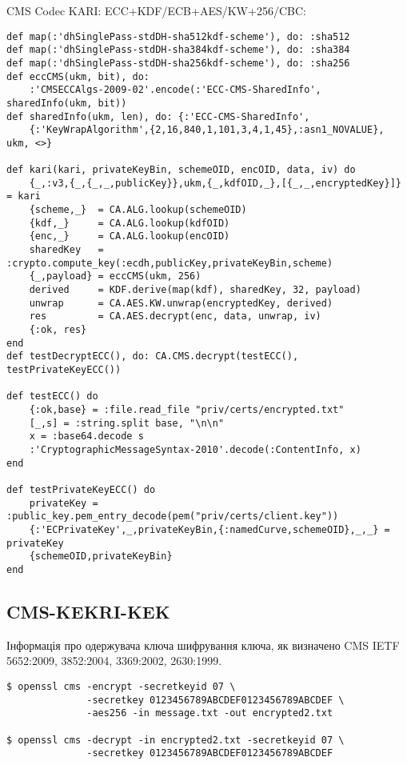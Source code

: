 CMS Codec KARI: ECC+KDF/ECB+AES/KW+256/CBC:

\begin{lstlisting}
def map(:'dhSinglePass-stdDH-sha512kdf-scheme'), do: :sha512
def map(:'dhSinglePass-stdDH-sha384kdf-scheme'), do: :sha384
def map(:'dhSinglePass-stdDH-sha256kdf-scheme'), do: :sha256
def eccCMS(ukm, bit), do:
    :'CMSECCAlgs-2009-02'.encode(:'ECC-CMS-SharedInfo', sharedInfo(ukm, bit))
def sharedInfo(ukm, len), do: {:'ECC-CMS-SharedInfo',
    {:'KeyWrapAlgorithm',{2,16,840,1,101,3,4,1,45},:asn1_NOVALUE}, ukm, <>}

def kari(kari, privateKeyBin, schemeOID, encOID, data, iv) do
    {_,:v3,{_,{_,_,publicKey}},ukm,{_,kdfOID,_},[{_,_,encryptedKey}]} = kari
    {scheme,_}  = CA.ALG.lookup(schemeOID)
    {kdf,_}     = CA.ALG.lookup(kdfOID)
    {enc,_}     = CA.ALG.lookup(encOID)
    sharedKey   = :crypto.compute_key(:ecdh,publicKey,privateKeyBin,scheme)
    {_,payload} = eccCMS(ukm, 256)
    derived     = KDF.derive(map(kdf), sharedKey, 32, payload)
    unwrap      = CA.AES.KW.unwrap(encryptedKey, derived)
    res         = CA.AES.decrypt(enc, data, unwrap, iv)
    {:ok, res}
end
def testDecryptECC(), do: CA.CMS.decrypt(testECC(), testPrivateKeyECC())

def testECC() do
    {:ok,base} = :file.read_file "priv/certs/encrypted.txt"
    [_,s] = :string.split base, "\n\n"
    x = :base64.decode s
    :'CryptographicMessageSyntax-2010'.decode(:ContentInfo, x)
end

def testPrivateKeyECC() do
    privateKey = :public_key.pem_entry_decode(pem("priv/certs/client.key"))
    {:'ECPrivateKey',_,privateKeyBin,{:namedCurve,schemeOID},_,_} = privateKey
    {schemeOID,privateKeyBin}
end
\end{lstlisting}


\newpage
\subsection{CMS-KEKRI-KEK}

Інформація про одержувача ключа шифрування ключа, як визначено CMS IETF 5652:2009, 3852:2004, 3369:2002, 2630:1999.

\begin{lstlisting}
$ openssl cms -encrypt -secretkeyid 07 \
              -secretkey 0123456789ABCDEF0123456789ABCDEF \
              -aes256 -in message.txt -out encrypted2.txt

$ openssl cms -decrypt -in encrypted2.txt -secretkeyid 07 \
              -secretkey 0123456789ABCDEF0123456789ABCDEF
\end{lstlisting}

